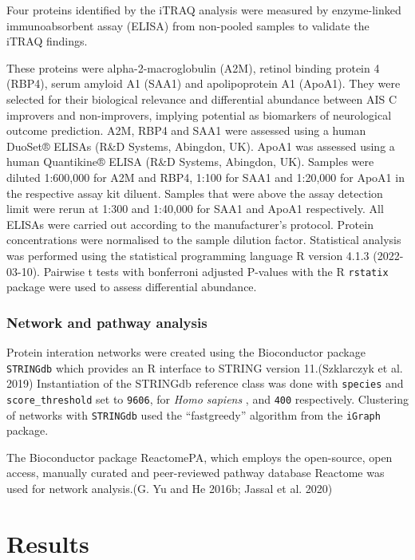 \documentclass[9pt,lineno]{elife}
\begin{document}
Four proteins identified by the iTRAQ analysis were measured by enzyme-linked immunoabsorbent assay (ELISA) from non-pooled samples to validate the iTRAQ findings.

These proteins were alpha-2-macroglobulin (A2M), retinol binding protein 4 (RBP4), serum amyloid A1 (SAA1) and apolipoprotein A1 (ApoA1).
They were selected for their biological relevance and differential abundance between AIS C improvers and non-improvers, implying potential as biomarkers of neurological outcome prediction.
A2M, RBP4 and SAA1 were assessed using a human DuoSet® ELISAs (R\&D Systems, Abingdon, UK).
ApoA1 was assessed using a human Quantikine® ELISA (R\&D Systems, Abingdon, UK).
Samples were diluted 1:600,000 for A2M and RBP4, 1:100 for SAA1 and 1:20,000 for ApoA1 in the respective assay kit diluent.
Samples that were above the assay detection limit were rerun at 1:300 and 1:40,000 for SAA1 and ApoA1 respectively.
All ELISAs were carried out according to the manufacturer's protocol.
Protein concentrations were normalised to the sample dilution factor.
Statistical analysis was performed using the statistical programming language R version 4.1.3 (2022-03-10).
Pairwise t tests with bonferroni adjusted P-values with the R \texttt{rstatix} package were used to assess differential abundance.

\clearpage

\hypertarget{pathway-analysis-chap3}{%
\subsubsection{Network and pathway analysis}\label{pathway-analysis-chap3}}

Protein interation networks were created using the Bioconductor package \texttt{STRINGdb} which provides an R interface to STRING version 11.(Szklarczyk et al. 2019)
Instantiation of the STRINGdb reference class was done with \texttt{species} and \texttt{score\_threshold} set to \texttt{9606}, for \emph{Homo sapiens} , and \texttt{400} respectively.
Clustering of networks with \texttt{STRINGdb} used the ``fastgreedy'' algorithm from the \texttt{iGraph} package.

The Bioconductor package ReactomePA, which employs the open-source, open access, manually curated and peer-reviewed pathway database Reactome was used for network analysis.(G. Yu and He 2016b; Jassal et al. 2020)

\hypertarget{results}{%
\section{Results}\label{results}}
\end{document}

